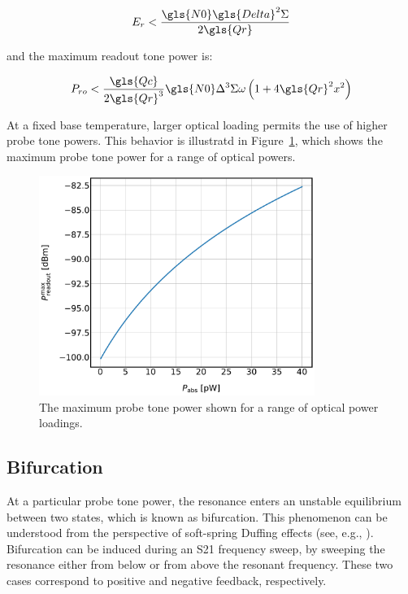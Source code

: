 \begin{equation}
  E_{r} < \frac{\gls{N0}\gls{Delta}^{2}\Sigma}{2\gls{Qr}}
\end{equation}

and the maximum readout tone power is:

\begin{equation} \label{eq:Pmax}
  P_{ro} < \frac{\gls{Qc}}{2\gls{Qr}^{3}}\gls{N0}\Delta^{3}\Sigma\omega\left(1 + 4\gls{Qr}^{2}x^{2} \right)
\end{equation}

At a fixed base temperature, larger optical loading permits the use of higher probe tone powers. This behavior is illustratd in Figure~\ref{fig:Pmax}, which shows the maximum probe tone power for a range of optical powers.

\begin{figure}[!htbp]
\centering
\includegraphics[width=0.8\textwidth]{figures/kid_model/Pmax}
\caption[~The maximum probe tone power shown for a range of optical power loadings.]{The maximum probe tone power shown for a range of optical power loadings.}
\label{fig:Pmax}
\end{figure}

\subsection{Bifurcation}\label{bifurc}

At a particular probe tone power, the resonance enters an unstable equilibrium between two states, which is known as bifurcation. This phenomenon can be understood from the perspective of soft-spring Duffing effects (see, e.g., \citet{swenson2013operation,duffing1918erzwungene}). Bifurcation can be induced during an \gls{S21} frequency sweep, by sweeping the resonance either from below or from above the resonant frequency. These two cases correspond to positive and negative feedback, respectively.

